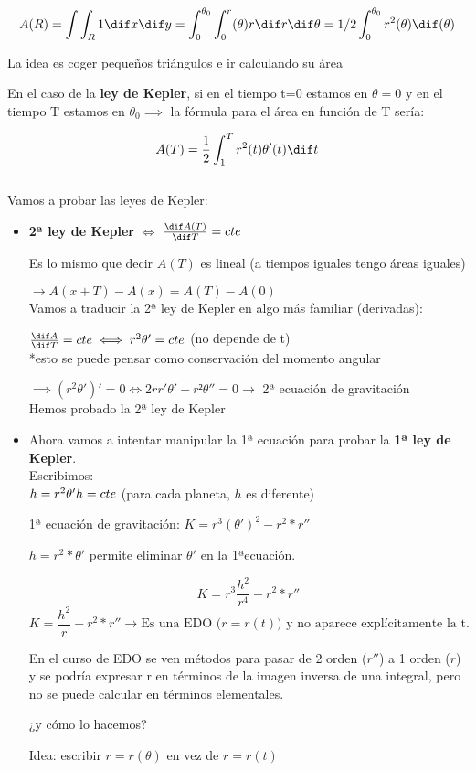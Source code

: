 $$A(R) = \int\int_R 1 \dif x \dif y = \int_0^{\theta_0} \int_0^r(\theta) r \dif r \dif \theta = 1/2 \int_0^{\theta_0} r^2(\theta) \dif(\theta)$$

La idea es coger pequeños triángulos e ir calculando su área

En el caso de la \textbf{ley de Kepler}, si en el tiempo t=0 estamos en $\theta = 0$ y en el tiempo T estamos en $\theta_0 \implies$ la fórmula para el área en función de T sería:

$$A(T) = \frac{1}{2} \int_1^T r^2(t) \theta'(t) \dif t$$
\\
Vamos a probar las leyes de Kepler:
\begin{itemize}
\item \textbf{2ª ley de Kepler} $\iff$ $\frac {\dif A(T)}{\dif T} = cte$

Es lo mismo que decir $A(T)$ es lineal (a tiempos iguales tengo áreas iguales)

$\rightarrow  A(x + T) - A(x) = A(T) - A(0)$\\

Vamos a traducir la 2ª ley de Kepler en algo más familiar (derivadas):

$\frac{\dif A}{\dif T} = cte \iff r^2\theta' = cte$  (no depende de t) \\
*esto se puede pensar como conservación del momento angular

$\implies (r^2\theta')' = 0 \iff 2rr'\theta' + r²\theta'' =0 \rightarrow$ 2ª ecuación de gravitación \\
Hemos probado la 2ª ley de Kepler

\item Ahora vamos a intentar manipular la 1ª ecuación para probar la \textbf{1ª ley de Kepler}. \\
Escribimos:\\ $h= r^2\theta'\\h=cte$ (para cada planeta, $h$ es diferente)

1ª ecuación de gravitación:
$K= r^3(\theta')^2 -r^2*r''$

$h = r^2*\theta'$ permite eliminar $\theta'$ en la 1ªecuación.

$$K= r^3 \frac{h^2}{r^4} - r^2*r''$$
$$K= \frac{h^2}{r} - r^2*r''  \rightarrow  \text{Es una EDO ($r = r(t)$) y no aparece explícitamente la t.}$$

\obs En el curso de EDO se ven métodos para pasar de 2 orden ($r''$) a 1 orden ($r$) y se podría expresar r en términos de la imagen inversa de una integral, pero no se puede calcular en términos elementales.

¿y cómo lo hacemos?

Idea: escribir $r=r(\theta)$ en vez de $r=r(t)$
\end{itemize}









